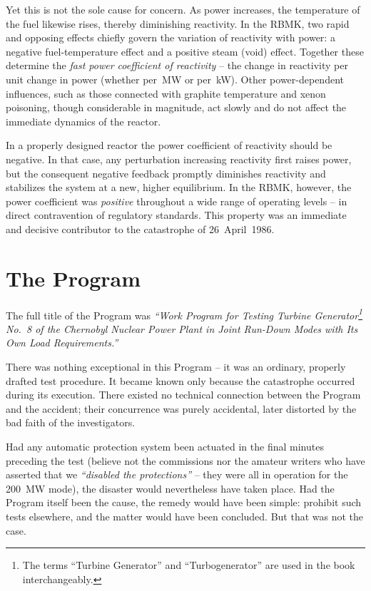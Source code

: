 \documentclass[openright]{bookest}
\begin{document}
Yet this is not the sole cause for concern. As power increases, the temperature of the fuel likewise rises, thereby diminishing reactivity. In the RBMK, two rapid and opposing effects chiefly govern the variation of reactivity with power: a negative fuel-temperature effect and a positive steam (void) effect. Together these determine the \textit{fast power coefficient of reactivity} -- the change in reactivity per unit change in power (whether per~MW or per~kW). Other power-dependent influences, such as those connected with graphite temperature and xenon poisoning, though considerable in magnitude, act slowly and do not affect the immediate dynamics of the reactor.

In a properly designed reactor the power coefficient of reactivity should be negative. In that case, any perturbation increasing reactivity first raises power, but the consequent negative feedback promptly diminishes reactivity and stabilizes the system at a new, higher equilibrium. In the RBMK, however, the power coefficient was \textit{positive} throughout a wide range of operating levels -- in direct contravention of regulatory standards. This property was an immediate and decisive contributor to the catastrophe of 26~April~1986.

\chapter{The Program}

The full title of the Program was \textit{``Work Program for Testing Turbine Generator\footnote{The terms ``Turbine Generator'' and ``Turbogenerator'' are used in the book interchangeably.} No.~8 of the Chernobyl Nuclear Power Plant in Joint Run-Down Modes with Its Own Load Requirements.''}

There was nothing exceptional in this Program -- it was an ordinary, properly drafted test procedure. It became known only because the catastrophe occurred during its execution. There existed no technical connection between the Program and the accident; their concurrence was purely accidental, later distorted by the bad faith of the investigators.

Had any automatic protection system been actuated in the final minutes preceding the test (believe not the commissions nor the amateur writers who have asserted that we \textit{``disabled the protections''} -- they were all in operation for the \qty{200}{\mega\watt} mode), the disaster would nevertheless have taken place. Had the Program itself been the cause, the remedy would have been simple: prohibit such tests elsewhere, and the matter would have been concluded. But that was not the case.
\end{document}
